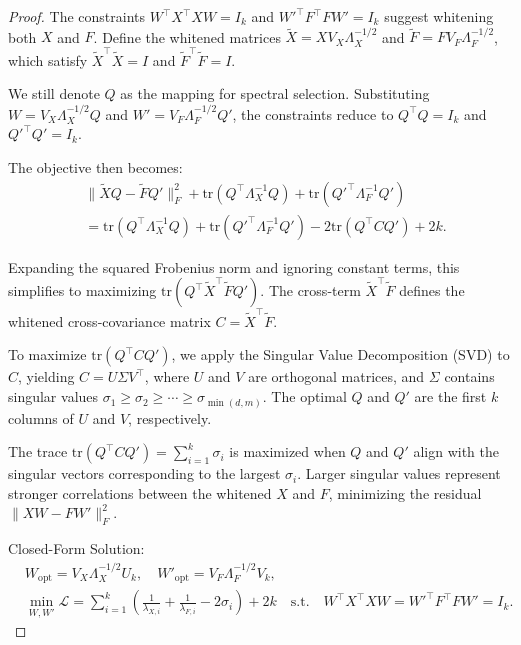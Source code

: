 \begin{proof}
    

The constraints \( W^\top X^\top X W = I_k \) and \( W'^\top F^\top F W' = I_k \) suggest whitening both \( X \) and \( F \). Define the whitened matrices \( \tilde{X} = X V_X\Lambda_X^{-1/2} \) and \( \tilde{F} = F V_F\Lambda_F^{-1/2} \), which satisfy \( \tilde{X}^\top \tilde{X} = I \) and \( \tilde{F}^\top \tilde{F} = I \). 

We still denote $Q$ as the mapping for spectral selection. Substituting \( W = V_X\Lambda_X^{-1/2} Q \) and \( W' = V_F\Lambda_F^{-1/2} Q' \), the constraints reduce to \( Q^\top Q = I_k \) and \( Q'^\top Q' = I_k \).  

The objective then becomes:  
\begin{equation}
\begin{aligned}
& \| \tilde{X} Q - \tilde{F} Q' \|_F^2 + \text{tr}(Q^\top \Lambda_X^{-1} Q) + \text{tr}(Q'^\top \Lambda_F^{-1} Q') \\
&  = \text{tr}\left(Q^\top \Lambda_X^{-1} Q\right) + \text{tr}\left(Q'^\top \Lambda_F^{-1} Q'\right) - 2 \text{tr}(Q^\top C Q') + 2k.
\end{aligned}
\end{equation}  

Expanding the squared Frobenius norm and ignoring constant terms, this simplifies to maximizing \( \text{tr}(Q^\top \tilde{X}^\top \tilde{F} Q') \). The cross-term \( \tilde{X}^\top \tilde{F} \) defines the whitened cross-covariance matrix \( C = \tilde{X}^\top \tilde{F} \).  

To maximize \( \text{tr}(Q^\top C Q') \), we apply the Singular Value Decomposition (SVD) to \( C \), yielding \( C = U \Sigma V^\top \), where \( U \) and \( V \) are orthogonal matrices, and \( \Sigma \) contains singular values \( \sigma_1 \geq \sigma_2 \geq \cdots \geq \sigma_{\min(d,m)} \). The optimal \( Q \) and \( Q' \) are the first \( k \) columns of \( U \) and \( V \), respectively.  


The trace \( \text{tr}(Q^\top C Q') = \sum_{i=1}^k \sigma_i \) is maximized when \( Q \) and \( Q' \) align with the singular vectors corresponding to the largest \( \sigma_i \). Larger singular values represent stronger correlations between the whitened \( X \) and \( F \), minimizing the residual \( \|XW - FW'\|_F^2 \).  

Closed-Form Solution:  
\begin{equation}
\begin{aligned}
& W_{\text{opt}} = V_X\Lambda_X^{-1/2} U_k, \quad W'_{\text{opt}} = V_F\Lambda_F^{-1/2} V_k, \\
& \min_{W, W'} \mathcal{L} = \sum_{i=1}^{k} ( \frac{1}{\lambda_{X,i}} + \frac{1}{\lambda_{F,i}} - 2 \sigma_i ) + 2k \quad \text{s.t.} \quad W^\top X^\top X W = W'^\top F^\top F W' = I_k.
\end{aligned}
\end{equation}  


\end{proof}
